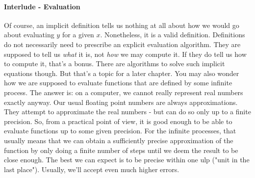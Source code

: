 

\paragraph{Interlude - Evaluation}
Of course, an implicit definition tells us nothing at all about how we would go about evaluating $y$ for a given $x$. Nonetheless, it is a valid definition. Definitions do not necessarily need to prescribe an explicit evaluation algorithm. They are supposed to tell us \emph{what} it is, not \emph{how} we may compute it. If they do tell us how to compute it, that's a bonus. There are algorithms to solve such implicit equations though. But that's a topic for a later chapter. You may also wonder how we are supposed to evaluate functions that are defined by some infinite process. The answer is: on a computer, we cannot really represent real numbers exactly anyway. Our usual floating point numbers are always approximations. They attempt to approximate the real numbers - but can do so only up to a finite precision. So, from a practical point of view, it is good enough to be able to evaluate functions up to some given precision. For the infinite processes, that usually means that we can obtain a sufficiently precise approximation of the function by only doing a finite number of steps until we deem the result to be close enough. The best we can expect is to be precise within one ulp ("unit in the last place"). Usually, we'll accept even much higher errors.





